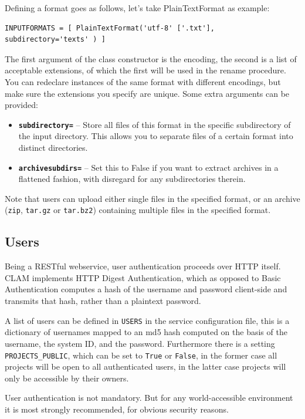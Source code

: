 \documentclass[a4paper,12pt]{report}
\begin{document}
Defining a format goes as follows, let's take PlainTextFormat as example:

\begin{verbatim}
INPUTFORMATS = [ PlainTextFormat('utf-8' ['.txt'], subdirectory='texts' ) ]
\end{verbatim}

The first argument of the class constructor is the encoding, the second is a list of acceptable extensions, of which the first will be used in the rename procedure. You can redeclare instances of the same format with different encodings, but make sure the extensions you specify are unique. Some extra arguments can be provided:

\begin{itemize}
\item \textbf{\texttt{subdirectory=}} -- Store all files of this format in the specific subdirectory of the input directory. This allows you to separate files of a certain format into distinct directories. 
\item \textbf{\texttt{archivesubdirs=}} -- Set this to False if you want to extract archives in a flattened fashion, with disregard for any subdirectories therein.
\end{itemize}

Note that users can upload either single files in the specified format, or an archive (\texttt{zip}, \texttt{tar.gz} or \texttt{tar.bz2}) containing multiple files in the specified format. 

\subsection{Users}

Being a RESTful webservice, user authentication proceeds over HTTP itself. CLAM implements HTTP Digest Authentication, which as opposed to Basic Authentication computes a hash of the username and password client-side and transmits that hash, rather than a plaintext password. 

A list of users can be defined in \texttt{USERS} in the service configuration file, this is a dictionary of usernames mapped to an md5 hash computed on the basis of the username, the system ID, and the password. Furthermore there is a setting \texttt{PROJECTS\_PUBLIC}, which can be set to \texttt{True} or \texttt{False}, in the former case all projects will be open to all authenticated users, in the latter case projects will only be accessible by their owners.

User authentication is not mandatory. But for any world-accessible environment it is most strongly recommended, for obvious security reasons.
\end{document}
